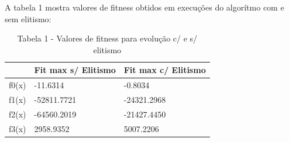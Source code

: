 \documentclass[conference]{IEEEtran}
\begin{document}
A tabela 1 mostra valores de fitness obtidos em execuções do algorítmo
com e sem elitismo:\\


\begin{table}[h]
\begin{tabular}{|l|l|l|}
\hline
      & Fit max s/ Elitismo & Fit max c/ Elitismo \\ \hline
f0(x) & -11.6314            & -0.8034             \\ \hline
f1(x) & -52811.7721         & -24321.2968         \\ \hline
f2(x) & -64560.2019         & -21427.4450         \\ \hline
f3(x) & 2958.9352           & 5007.2206           \\ \hline
\end{tabular}
\caption*{Tabela 1 - Valores de fitness para evolução c/ e s/ elitismo}
\end{table}


\begin{figure}[!t]
\centering
{}
\hfil
{}
\label{fig_sim}
\end{figure}
\end{document}
